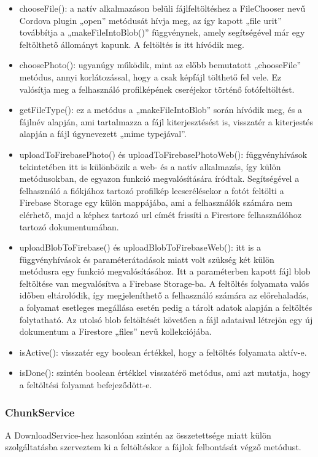 \documentclass[12pt]{report}
\begin{document}
\begin{itemize}
	\item chooseFile(): a natív alkalmazáson belüli fájlfeltöltéshez a FileChooser nevű Cordova plugin „open” metódusát hívja meg, az így kapott „file urit” továbbítja a „makeFileIntoBlob()” függvénynek, amely segítségével már egy feltölthető állományt kapunk. A feltöltés is itt hívódik meg.
	\item choosePhoto(): ugyanúgy működik, mint az előbb bemutatott  „chooseFile” metódus, annyi korlátozással, hogy a csak képfájl tölthető fel vele. Ez valósítja meg a felhasználó profilképének cseréjekor történő fotófeltöltést.
	\item  getFileType(): ez a metódus a „makeFileIntoBlob” során hívódik meg, és a fájlnév alapján, ami tartalmazza a fájl kiterjesztésést is, visszatér a kiterjestés alapján a fájl úgynevezett „mime typejával”.
	\item  uploadToFirebasePhoto() és uploadToFirebasePhotoWeb(): függvényhívások tekintetében itt is különbözik a web- és a natív alkalmazás, így külön metódusokban, de egyazon funkció megvalósítására íródtak. Segítségével a felhasználó a fiókjához tartozó profilkép lecserélésekor a fotót feltölti a Firebase Storage egy külön mappájába, ami a felhasználók számára nem elérhető, majd a képhez tartozó url címét frissíti a Firestore felhasználóhoz tartozó dokumentumában.
	\item 	uploadBlobToFirebase() és uploadBlobToFirebaseWeb(): itt is a függvényhívások és paraméterátadások miatt volt szükség két külön metódusra egy funkció megvalósításához. Itt a paraméterben kapott fájl blob feltöltése van megvalósítva a Firebase Storage-ba. A feltöltés folyamata valós időben eltárolódik, így megjeleníthető a felhasználó számára az előrehaladás, a folyamat esetleges megállása esetén pedig a tárolt adatok alapján a feltöltés folytatható. Az utolsó blob feltöltését követően a fájl adataival létrejön egy új dokumentum a Firestore „files” nevű kollekciójába.
	\item isActive(): visszatér egy boolean értékkel, hogy a feltöltés folyamata aktív-e.
	\item isDone(): szintén boolean értékkel visszatérő metódus, ami azt mutatja, hogy a feltöltési folyamat befejeződött-e.
\end{itemize}

\subsubsection{ChunkService}
A DownloadService-hez hasonlóan szintén az összetettsége miatt külön szolgáltatásba szerveztem ki a feltöltéskor a fájlok felbontását végző metódust.
\end{document}
